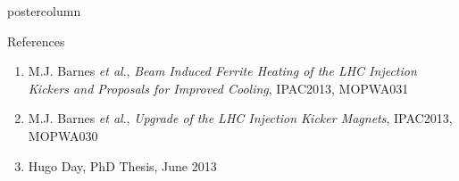 \documentclass[final,hyperref={pdfpagelabels=false}]{beamer}
\begin{document}
\begin{frame}
\begin{columns}
\begin{column}{.49\textwidth}
\begin{beamercolorbox}[center,wd=\textwidth]{postercolumn}
\begin{minipage}[T]{.95\textwidth}
{\vfill
\begin{block}{References}
\begin{enumerate}
\item{\small{M.J. Barnes \emph{et al}., \emph{Beam Induced Ferrite Heating of the LHC Injection Kickers and Proposals for Improved Cooling}, IPAC2013, MOPWA031}}
\item{\small{M.J. Barnes \emph{et al}., \emph{Upgrade of the LHC Injection Kicker Magnets}, IPAC2013, MOPWA030}}
\item{\small{Hugo Day, PhD Thesis, June 2013}}
\end{enumerate}
\end{block}
         \vfill
          }
        \end{minipage}
      \end{beamercolorbox}
    \end{column}


\end{columns}
\end{frame}
\end{document}
